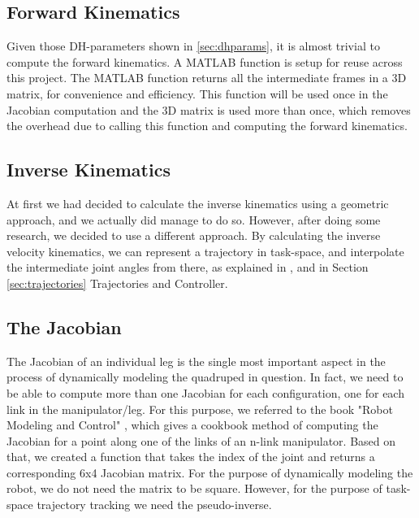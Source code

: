 \subsection{Forward Kinematics}
Given those DH-parameters shown in \ref{sec:dhparams}, it is almost trivial to compute the forward kinematics. A MATLAB function is setup for reuse across this project. The MATLAB function returns all the intermediate frames in a 3D matrix, for convenience and efficiency. This function will be used once in the Jacobian computation and the 3D matrix is used more than once, which removes the overhead due to calling this function and computing the forward kinematics.

\subsection{Inverse Kinematics}
At first we had decided to calculate the inverse kinematics using a geometric approach, and we actually did manage to do so. However, after doing some research, we decided to use a different approach. By calculating the inverse velocity kinematics, we can represent a trajectory in task-space, and interpolate the intermediate joint angles from there, as explained in \cite{spong2006robot}, and in Section \ref{sec:trajectories} Trajectories and Controller.


\subsection{The Jacobian}
The Jacobian of an individual leg is the single most important aspect in the process of dynamically modeling the quadruped in question. In fact, we need to be able to compute more than one Jacobian for each configuration, one for each link in the manipulator/leg.
For this purpose, we referred to the book "Robot Modeling and Control" \cite{spong2006robot}, which gives a cookbook method of computing the Jacobian for a point along one of the links of an n-link manipulator. Based on that, we created a function that takes the index of the joint and returns a corresponding 6x4 Jacobian matrix. For the purpose of dynamically modeling the robot, we do not need the matrix to be square. However, for the purpose of task-space trajectory tracking we need the pseudo-inverse.

